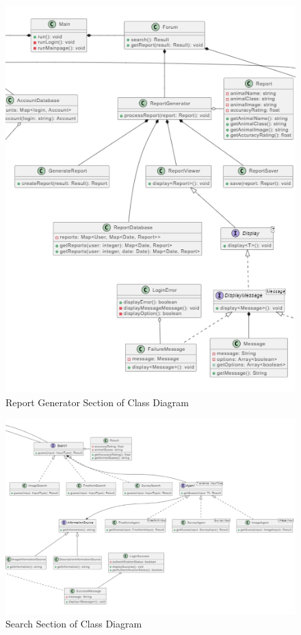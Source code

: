 \documentclass[]{article}
\numberwithin{figure}{section}
\begin{document}
\begin{figure}[h]
    \centering
    \includegraphics[scale=1.5]{reportGenerator_Section4D3_group6_SFWRENG3A04.png}
    \caption{Report Generator Section of Class Diagram}
    \label{fig:accountManager_Section4D3_group6_SFWRENG3A04}
\end{figure}
\clearpage
\begin{figure}[h]
    \centering
    \includegraphics[scale=0.7]{search_Section4D3_group6_SFWRENG3A04.png}
    \caption{Search Section of Class Diagram}
    \label{fig:search_Section4D3_group6_SFWRENG3A04}
\end{figure}
\clearpage%
\end{document}
